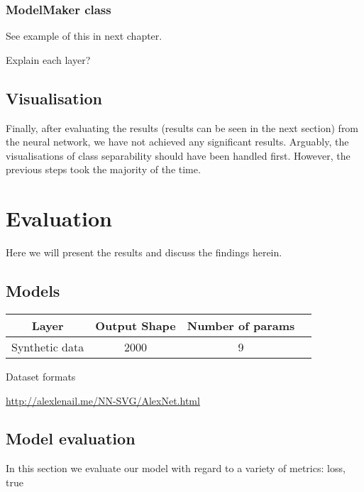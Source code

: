 \subsection{ModelMaker class}
See example of this in next chapter.

Explain each layer?


\section{Visualisation}
Finally, after evaluating the results (results can be seen in the next section) from the neural network, we have not achieved any significant results. Arguably, the visualisations of class separability should have been handled first. However, the previous steps took the majority of the time.

\chapter{Evaluation}
Here we will present the results and discuss the findings herein.


\section{Models}
\begin{table}[H]
	\centering
	 \label{tab:title2} 
	\begin{tabular}{|c|c|c| c|} \hline
		\textbf{Layer} & \textbf{Output Shape } & \textbf{Number of params} \\ \hline \hline 
		Synthetic data & 2000 &  9  \\ \hline 

	\end{tabular}
	\par \bigskip Dataset formats
	\label{datasets}
\end{table}

\url{http://alexlenail.me/NN-SVG/AlexNet.html}

\section{Model evaluation}
In this section we evaluate our model with regard to a variety of metrics: loss, true

